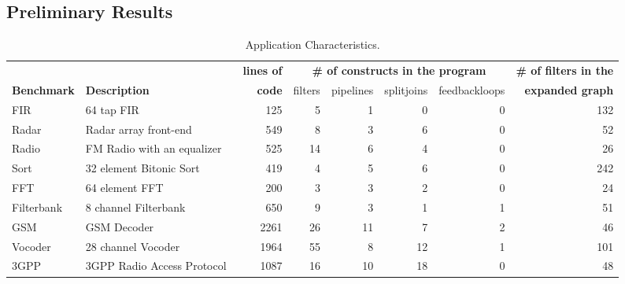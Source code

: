\subsection{Preliminary Results}
\label{sec:results}

\begin{table*}[!t]
\begin{center}
\scriptsize
\begin{tabular}{|l|l||r||r|r|r|r||r||} \hline
 & & {\bf lines of} & \multicolumn{4}{|c||}{\bf \# of constructs in the program} & {\bf \# of filters in the} \\ \cline{4-7}
{\bf Benchmark} & {\bf Description} & {\bf code} & filters & pipelines & splitjoins & feedbackloops & {\bf expanded graph}
\\
\hline \hline
FIR & 64 tap FIR & 
125 & 5 & 1 & 0 & 0 & 132
\\ \hline
Radar & Radar array front-end~\cite{pca} & 
549 & 8 & 3 & 6 & 0 & 52
\\ \hline
Radio & FM Radio with an equalizer & 
525& 14 & 6 & 4 & 0 & 26
\\ \hline
Sort & 32 element Bitonic Sort & 
419 & 4 & 5 & 6 & 0 & 242
\\  \hline
FFT & 64 element FFT & 
200 & 3 & 3 & 2 & 0 & 24
\\  \hline
Filterbank & 8 channel Filterbank & 
650 & 9 & 3 & 1 & 1 & 51
\\  \hline
GSM & GSM Decoder & 
2261 & 26 & 11 & 7 & 2 & 46
\\ \hline
Vocoder & 28 channel Vocoder~\cite{seneff80} &  
1964 & 55 & 8 & 12 & 1 & 101
\\ \hline
3GPP & 3GPP Radio Access Protocol~\cite{3gpp} &  
1087 & 16 & 10 & 18 & 0 & 48
\\ \hline
\hline
\end{tabular}
\caption{\protect\small Application Characteristics.}
\label{tab:benchmarks}
\end{center}
\end{table*}


